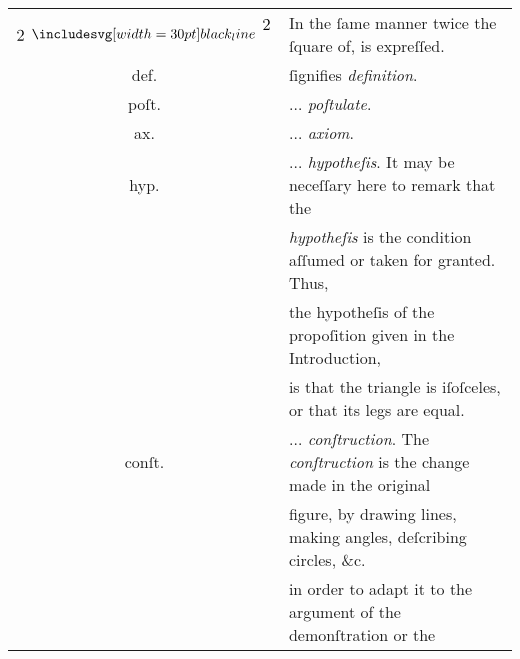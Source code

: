 \begin{center}
\begin{minipage}{0.8\textwidth}
\begin{tabular}{c l}
            $\text{\large 2} \blackline^{\text{\large 2}}$                                                   & In the ſame manner twice the ſquare of, is expreſſed.                                        \\
            def.                                                                                             & ſignifies \textit{definition}.                                                               \\
            poſt.                                                                                            & $\dots$ \textit{poſtulate}.                                                                  \\
            ax.                                                                                              & $\dots$ \textit{axiom}.                                                                      \\
            hyp.                                                                                             & $\dots$ \textit{hypotheſis}. It may be neceſſary here to remark that the                     \\
                                                                                                             & \textit{hypotheſis} is the condition aſſumed or taken for granted.  Thus,                    \\
                                                                                                             & the hypotheſis of the propoſition given in the Introduction,                                 \\
                                                                                                             & is that the triangle is iſoſceles, or that its legs are equal.                               \\
            conſt.                                                                                           & $\dots$ \textit{conſtruction}.  The \textit{conſtruction} is the change made in the original \\
                                                                                                             & figure, by drawing lines, making angles, deſcribing circles, \&c.                            \\
                                                                                                             & in order to adapt it to the argument of the demonſtration or the                             \\

\end{tabular}
\end{minipage}
\end{center}
